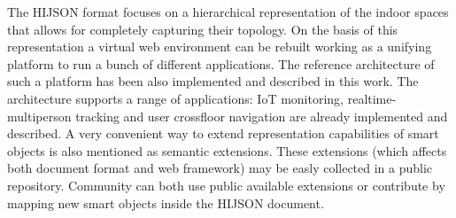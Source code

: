 \documentclass{sig-alternate}
\begin{document}
The HIJSON format focuses on a hierarchical representation of the indoor spaces that allows for completely capturing their topology. On the basis of this representation a virtual web environment can be rebuilt working as a unifying platform to run a bunch of different applications. The reference architecture of such a platform has been also implemented and described in this work. The architecture supports a range of applications: IoT monitoring, realtime-multiperson tracking and user crossfloor navigation are already implemented and described. A very convenient way to extend representation capabilities of smart objects is also mentioned as semantic extensions. These extensions (which affects both document format and web framework) may be easly collected in a public repository. Community can both use public available extensions or contribute by mapping new smart objects inside the HIJSON document.

%

%
%
\end{document}
